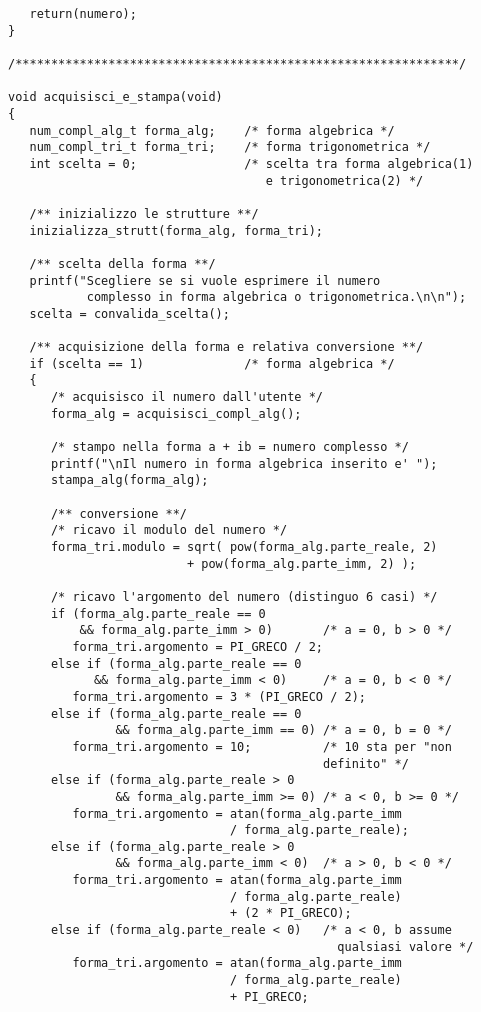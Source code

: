 \documentclass[a4paper,10pt]{article}
\begin{document}
\begin{verbatim}
   return(numero);
}

/**************************************************************/

void acquisisci_e_stampa(void)
{
   num_compl_alg_t forma_alg;    /* forma algebrica */
   num_compl_tri_t forma_tri;    /* forma trigonometrica */
   int scelta = 0;               /* scelta tra forma algebrica(1)
                                    e trigonometrica(2) */

   /** inizializzo le strutture **/
   inizializza_strutt(forma_alg, forma_tri);

   /** scelta della forma **/
   printf("Scegliere se si vuole esprimere il numero 
           complesso in forma algebrica o trigonometrica.\n\n");
   scelta = convalida_scelta();

   /** acquisizione della forma e relativa conversione **/
   if (scelta == 1)              /* forma algebrica */
   {
      /* acquisisco il numero dall'utente */
      forma_alg = acquisisci_compl_alg();

      /* stampo nella forma a + ib = numero complesso */
      printf("\nIl numero in forma algebrica inserito e' ");
      stampa_alg(forma_alg);

      /** conversione **/
      /* ricavo il modulo del numero */
      forma_tri.modulo = sqrt( pow(forma_alg.parte_reale, 2)
                         + pow(forma_alg.parte_imm, 2) );

      /* ricavo l'argomento del numero (distinguo 6 casi) */
      if (forma_alg.parte_reale == 0 
          && forma_alg.parte_imm > 0)       /* a = 0, b > 0 */
         forma_tri.argomento = PI_GRECO / 2;
      else if (forma_alg.parte_reale == 0
            && forma_alg.parte_imm < 0)     /* a = 0, b < 0 */
         forma_tri.argomento = 3 * (PI_GRECO / 2);
      else if (forma_alg.parte_reale == 0
               && forma_alg.parte_imm == 0) /* a = 0, b = 0 */
         forma_tri.argomento = 10;          /* 10 sta per "non
                                            definito" */
      else if (forma_alg.parte_reale > 0
               && forma_alg.parte_imm >= 0) /* a < 0, b >= 0 */
         forma_tri.argomento = atan(forma_alg.parte_imm
                               / forma_alg.parte_reale);
      else if (forma_alg.parte_reale > 0
               && forma_alg.parte_imm < 0)  /* a > 0, b < 0 */
         forma_tri.argomento = atan(forma_alg.parte_imm
                               / forma_alg.parte_reale)
                               + (2 * PI_GRECO);
      else if (forma_alg.parte_reale < 0)   /* a < 0, b assume
                                              qualsiasi valore */
         forma_tri.argomento = atan(forma_alg.parte_imm 
                               / forma_alg.parte_reale)
                               + PI_GRECO;


\end{verbatim}
\end{document}
